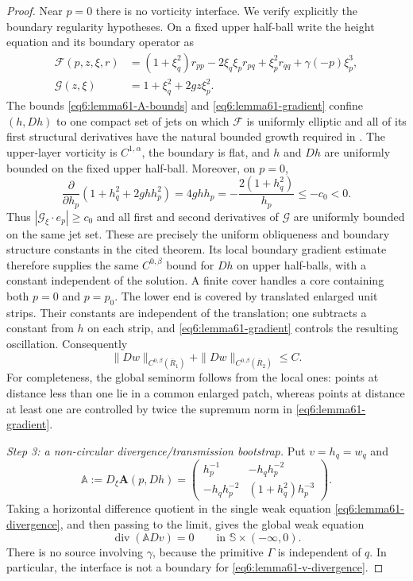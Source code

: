 \documentclass[11pt,reqno]{amsart}
\numberwithin{equation}{section}
\theoremstyle{definition}
\theoremstyle{remark}
\begin{document}
\begin{proof}
Near $p=0$ there is no vorticity interface.  We verify explicitly the
boundary regularity hypotheses.  On a fixed upper half-ball write
the height equation and its boundary operator as
\[
 \begin{aligned}
 \mathcal F(p,z,\xi,r)
 &=(1+\xi_q^2)r_{pp}-2\xi_q\xi_p r_{pq}
   +\xi_p^2r_{qq}+\gamma(-p)\xi_p^3,\\
 \mathcal G(z,\xi)&=1+\xi_q^2+2gz\xi_p^2.
 \end{aligned}
\]
The bounds \eqref{eq6:lemma61-A-bounds} and
\eqref{eq6:lemma61-gradient} confine
$(h,Dh)$ to one compact set of jets on which $\mathcal F$ is
uniformly elliptic and all of its first structural derivatives have
the natural bounded growth required in
\cite[Theorem 4.1]{LiebermanTrudinger}.  The upper-layer vorticity is
$C^{1,\alpha}$, the boundary is flat, and $h$ and $Dh$ are uniformly
bounded on the fixed upper half-ball.
Moreover, on $p=0$,
\[
 \frac{\partial}{\partial h_p}
 (1+h_q^2+2ghh_p^2)
 =4ghh_p=-\frac{2(1+h_q^2)}{h_p}\le-c_0<0.
\]
Thus $|\mathcal G_{\xi}\cdot e_p|\ge c_0$ and all first and second
derivatives of $\mathcal G$ are uniformly bounded on the same jet
set.  These are precisely the uniform obliqueness and boundary
structure constants in the cited theorem.  Its local boundary
gradient estimate therefore supplies the same $C^{0,\beta}$ bound
for $Dh$ on upper half-balls, with a constant independent of the
solution.  A finite cover handles a core containing both $p=0$ and
$p=p_0$.  The lower end is covered by translated enlarged unit
strips.  Their constants are independent of the translation; one
subtracts a constant from $h$ on each strip, and
\eqref{eq6:lemma61-gradient} controls the resulting oscillation.
Consequently
\begin{equation}\label{eq6:lemma61-C1beta}
 \|Dw\|_{C^{0,\beta}(\overline R_1)}
 +\|Dw\|_{C^{0,\beta}(\overline R_2)}\le C.
\end{equation}
For completeness, the global seminorm follows from the local ones:
points at distance less than one lie in a common enlarged patch,
whereas points at distance at least one are controlled by twice the
supremum norm in \eqref{eq6:lemma61-gradient}.

\smallskip
\noindent\emph{Step 3: a non-circular divergence/transmission
bootstrap.}
Put $v=h_q=w_q$ and
\[
 \mathbb A:=D_\xi\mathbf A(p,Dh)=
 \begin{pmatrix}
  h_p^{-1}&-h_qh_p^{-2}\\
  -h_qh_p^{-2}&(1+h_q^2)h_p^{-3}
 \end{pmatrix}.
\]
Taking a horizontal difference quotient in the single weak equation
\eqref{eq6:lemma61-divergence}, and then passing to the limit, gives
the global weak equation
\begin{equation}\label{eq6:lemma61-v-divergence}
 \operatorname{div}(\mathbb A Dv)=0
 \qquad\text{in }\mathbb S\times(-\infty,0).
\end{equation}
There is no source involving $\gamma$, because the primitive
$\Gamma$ is independent of $q$.  In particular, the interface is
not a boundary for \eqref{eq6:lemma61-v-divergence}.


\end{proof}
\end{document}
